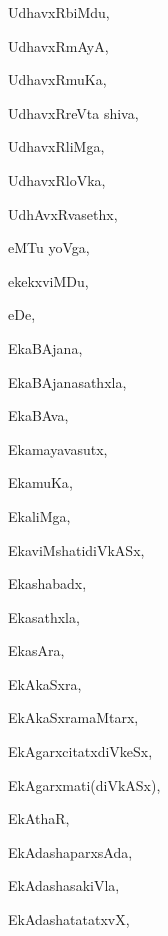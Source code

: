 \begin{multicols}{3}
{\noindent
{UdhavxRbiMdu}, \pageref{UdhavxRbiMdu}

\noindent
{UdhavxRmAyA}, \pageref{UdhavxRmAyA}

\noindent
{UdhavxRmuKa}, \pageref{UdhavxRmuKa}

\noindent
{UdhavxRreVta shiva}, \pageref{UdhavxRreVta shiva}

\noindent
{UdhavxRliMga}, \pageref{UdhavxRliMga}

\noindent
{UdhavxRloVka}, \pageref{UdhavxRloVka}

\noindent
{UdhAvxRvasethx}, \pageref{UdhAvxRvasethx}

\bigskip
\noindent
{}
\smallskip

\noindent
{eMTu yoVga}, \pageref{eMTu yoVga}

\noindent
{ekekxviMDu}, \pageref{ekekxviMDu}

\noindent
{eDe}, \pageref{eDe}

\bigskip
\noindent
{}
\smallskip

\noindent
{EkaBAjana}, \pageref{EkaBAjana}

\noindent
{EkaBAjanasathxla}, \pageref{EkaBAjanasathxla}

\noindent
{EkaBAva}, \pageref{EkaBAva}

\noindent
{Ekamayavasutx}, \pageref{Ekamayavasutx}

\noindent
{EkamuKa}, \pageref{EkamuKa}

\noindent
{EkaliMga}, \pageref{EkaliMga}

\noindent
{EkaviMshatidiVkASx}, \pageref{EkaviMshatidiVkASx}

\noindent
{Ekashabadx}, \pageref{Ekashabadx}

\noindent
{Ekasathxla}, \pageref{Ekasathxla}

\noindent
{EkasAra}, \pageref{EkasAra}

\noindent
{EkAkaSxra}, \pageref{EkAkaSxra}

\noindent
{EkAkaSxramaMtarx}, \pageref{EkAkaSxramaMtarx}

\noindent
{EkAgarxcitatxdiVkeSx}, \pageref{EkAgarxcitatxdiVkeSx}

\noindent
{EkAgarxmati(diVkASx)}, \pageref{EkAgarxmati(diVkASx)}

\noindent
{EkAthaR}, \pageref{EkAthaR}

\noindent
{EkAdashaparxsAda}, \pageref{EkAdashaparxsAda}

\noindent
{EkAdashasakiVla}, \pageref{EkAdashasakiVla}

\noindent
{EkAdashatatatxvX}, \pageref{EkAdashatatatxvX}

}
\end{multicols}
